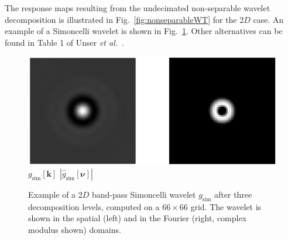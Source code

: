 \documentclass[fleqn,a4paper,oneside,openany]{book}
\begin{document}
The response maps resulting from the undecimated non-separable wavelet decomposition is illustrated in Fig.~\ref{fig:nonseparableWT} for the 2$D$ case.
%
An example of a Simoncelli wavelet is shown in Fig.~\ref{fig:simoncelli}.
Other alternatives can be found in Table 1 of Unser \textit{et al.}~\cite{UCV2011}.
%
\begin{figure}
\centering
\includegraphics[trim = 0 0 0 0, clip, width=0.6\linewidth]{Simoncelli.png}\\
$g_{\text{sim}}[\boldsymbol{k}]$
\hspace{3.05cm}
$|\hat{g}_{\text{sim}}[\boldsymbol{\nu}]|$
\caption{Example of a 2$D$ band-pass Simoncelli wavelet $g_{\text{sim}}$ after three decomposition levels, computed on a $66\times 66$ grid.
The wavelet is shown in the spatial (left) and in the Fourier (right, complex modulus shown) domains.}
  \label{fig:simoncelli}
\end{figure}
%





\end{document}
